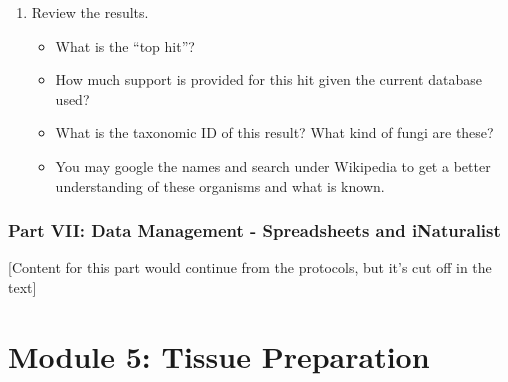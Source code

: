 \documentclass[
  letterpaper,
  DIV=11,
  numbers=noendperiod]{scrreprt}
\providecommand{\tightlist}{%
  \setlength{\itemsep}{0pt}\setlength{\parskip}{0pt}}
\begin{document}
\begin{enumerate}
  \begin{itemize}
  \tightlist
  \item
    Genbank will then begin to query your sequence against sequences in
    the database. The top hit that comes back will be the sequence that
    is most like your sequence based on several stats.
  \item
    Percent Identity = What percent of your sequence (query sequence) is
    identical to the matched sequence.
  \item
    Query Cover = How much of the query sequence covers the matched
    sequence.
  \item
    E value = The probability that this match occurred by chance in the
    provided database.
  \end{itemize}
\item
  Review the results.

  \begin{itemize}
  \tightlist
  \item
    What is the ``top hit''?
  \item
    How much support is provided for this hit given the current database
    used?
  \item
    What is the taxonomic ID of this result? What kind of fungi are
    these?
  \item
    You may google the names and search under Wikipedia to get a better
    understanding of these organisms and what is known.
  \end{itemize}
\end{enumerate}

\subsection*{Part VII: Data Management - Spreadsheets and
iNaturalist}\label{part-vii-data-management---spreadsheets-and-inaturalist}

{[}Content for this part would continue from the protocols, but it's cut
off in the text{]}


\chapter*{Module 5: Tissue
Preparation}\label{module-5-tissue-preparation}
\end{document}

